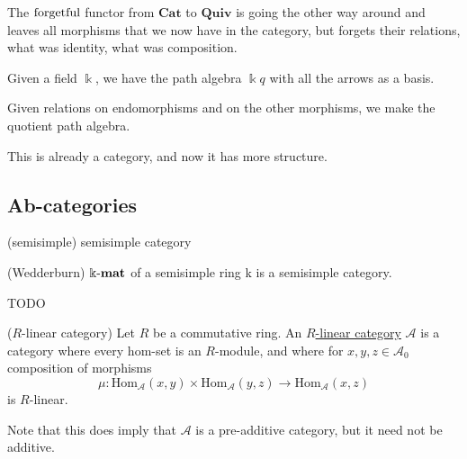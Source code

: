 The $\textup{forgetful}$ functor from $\mathbf{Cat}$ to $\mathbf{Quiv}$ is going the other way around and leaves all
morphisms that we now have in the category, but forgets their relations, what was identity, what was composition.

Given a field $\Bbbk$, we have the path algebra $\Bbbk q$ with all the arrows as a basis.

Given relations on endomorphisms and on the other morphisms, we make the quotient path algebra.

This is already a category, and now it has more structure.

\subsection{Ab-categories}


\begin{definition}{(semisimple)}
semisimple category
\end{definition}

\begin{theorem}{(Wedderburn)}
$\Bbbk\textnormal{-}\mathbf{mat}$ of a semisimple ring k is a semisimple category.
\end{theorem}
TODO








\begin{definition}{($R$-linear category)}
Let $R$ be a commutative ring. An \ul{$R$-linear category} $\mathcal{A}$ is a category where every hom-set is an
$R$-module, and where for $x,y,z \in \mathcal{A}_{0}$ composition of morphisms
\[
\mu : \mathrm{Hom}_{\mathcal{A}}(x,y) \times \mathrm{Hom}_{\mathcal{A}}(y,z) \rightarrow \mathrm{Hom}_{\mathcal{A}}(x,z)
\]
is $R$-linear.

Note that this does imply that $\mathcal{A}$ is a pre-additive category, but it need not be additive.
\end{definition}

